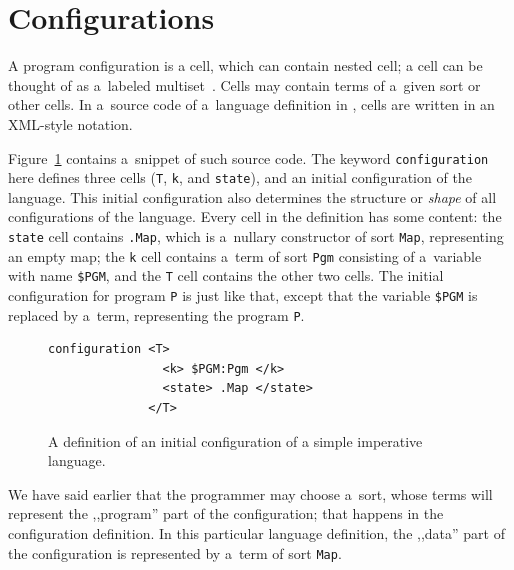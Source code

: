 \documentclass[nolot,nolof,nocover,printed]{fithesis3}
\begin{document}
\section{Configurations}

A program configuration is a cell, which can contain nested cell; a cell 
can be thought of as a~labeled multiset~\cite{hathhorn-ellison-rosu-2015-pldi}. Cells may contain terms of a~given sort or other cells. In a~source code of a~language definition in \K, cells are written in an XML-style notation.

Figure~\ref{impConfiguration} contains a~snippet of such source code. The keyword \texttt{configuration} here defines three cells (\texttt{T}, \texttt{k}, and \texttt{state}), and an initial configuration of the language. This initial configuration also determines the structure or \textit{shape} of all configurations of the language. Every cell in the definition has some content: the \texttt{state} cell contains \lstinline|.Map|, which is a~nullary constructor of sort \texttt{Map}, representing an empty map; the \texttt{k} cell contains a~term of sort \texttt{Pgm} consisting of a~variable with name 
\texttt{\$PGM}, and the \texttt{T} cell contains the other two cells. The initial configuration for program \texttt{P} is just like that, except that the variable \texttt{\$PGM} is replaced by a~term, representing the program \texttt{P}.

\begin{figure}
\begin{lstlisting}
configuration <T>
                <k> $PGM:Pgm </k>
                <state> .Map </state>
              </T>
\end{lstlisting}
\caption{A definition of an initial configuration of a simple imperative language.}
\label{impConfiguration}
\end{figure}

We have said earlier that the programmer may choose a~sort, whose terms will represent the ,,program'' part of the configuration; that happens in the configuration definition. In this particular language definition, the ,,data'' part of the configuration is represented by a~term of sort \texttt{Map}. %



\end{document}
